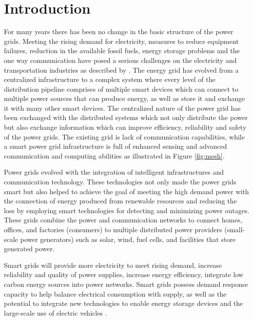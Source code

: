 \chapter{Introduction}
\graphicspath{ {images/} }

\frenchspacing
For many years there has been no change in the basic structure of the power grids. Meeting the rising demand for electricity, measures to reduce equipment failures, reduction in the available fossil fuels, energy storage problems and the one way communication have posed a serious challenges on the electricity and transportation industries as described by  \cite{gungor2011smart}.  The energy grid has evolved from a centralized infrastructure to a complex system where every level of the distribution pipeline comprises of multiple smart devices which can connect to multiple power sources that can produce energy, as well as store it and exchange it with many other smart devices. The centralized nature of the power grid has been exchanged with the distributed systems which not only distribute the power but also exchange information which can improve efficiency, reliability and safety of the power grids. The existing grid is lack of communication capabilities, while a smart power grid infrastructure is full of enhanced sensing and advanced communication and computing abilities as illustrated in Figure \ref{fig:mesh}.

Power grids evolved with the integration of intelligent infrastructures and communication technology. These technologies not only made the power grids smart but also helped to achieve the goal of meeting the high demand power with the connection of energy produced from renewable resources and reducing the loss by employing smart technologies for detecting and minimizing power outages. These grids combine the  power and communication networks to connect homes, offices, and factories (consumers) to multiple distributed power providers (small-scale power generators) such as solar, wind, fuel cells, and facilities that store generated power. 

Smart grids will provide more electricity to meet rising demand, increase reliability and quality of power supplies, increase energy efficiency, integrate low carbon energy sources into power networks. Smart grids possess demand response capacity to help balance electrical consumption with supply, as well as the potential to integrate new technologies to enable energy storage devices and the large-scale use of electric vehicles \cite{abb}. 

